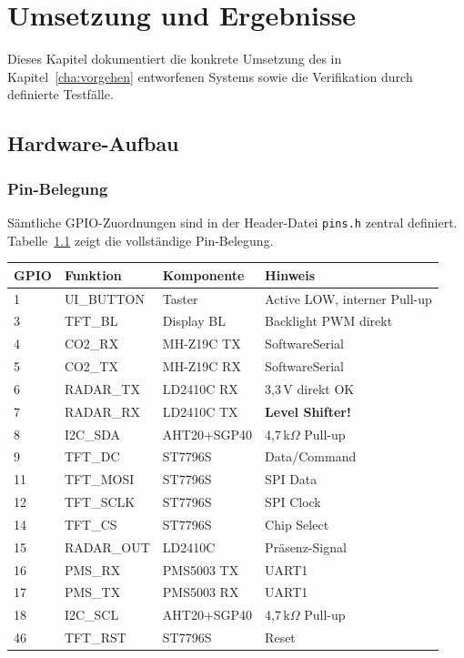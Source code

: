 \chapter{Umsetzung und Ergebnisse}
\label{cha:umsetzung}

Dieses Kapitel dokumentiert die konkrete Umsetzung des in Kapitel~\ref{cha:vorgehen} entworfenen Systems sowie die Verifikation durch definierte Testfälle.

\section{Hardware-Aufbau}
\label{sec:hw_aufbau}

\subsection{Pin-Belegung}
\label{sec:pinbelegung}

Sämtliche GPIO-Zuordnungen sind in der Header-Datei \texttt{pins.h} zentral definiert. Tabelle~\ref{tab:pinmap} zeigt die vollständige Pin-Belegung.

\begin{table}[htb]
\centering
\renewcommand{\arraystretch}{1.2}
\label{tab:pinmap}
\begin{tabular}{l l l p{4.5cm}}
\toprule
\rowcolor{tableheader}
\textbf{GPIO} & \textbf{Funktion} & \textbf{Komponente} & \textbf{Hinweis} \\
\midrule
1  & UI\_BUTTON  & Taster & Active LOW, interner Pull-up \\
3  & TFT\_BL     & Display BL & Backlight PWM direkt \\
4  & CO2\_RX     & MH-Z19C TX & SoftwareSerial \\
5  & CO2\_TX     & MH-Z19C RX & SoftwareSerial \\
6  & RADAR\_TX   & LD2410C RX & 3,3\,V direkt OK \\
7  & RADAR\_RX   & LD2410C TX & \textbf{Level Shifter!} \\
8  & I2C\_SDA    & AHT20+SGP40 & 4,7\,k$\Omega$ Pull-up \\
9  & TFT\_DC     & ST7796S & Data/Command \\
11 & TFT\_MOSI   & ST7796S & SPI Data \\
12 & TFT\_SCLK   & ST7796S & SPI Clock \\
14 & TFT\_CS     & ST7796S & Chip Select \\
15 & RADAR\_OUT  & LD2410C & Präsenz-Signal \\
16 & PMS\_RX     & PMS5003 TX & UART1 \\
17 & PMS\_TX     & PMS5003 RX & UART1 \\
18 & I2C\_SCL    & AHT20+SGP40 & 4,7\,k$\Omega$ Pull-up \\
46 & TFT\_RST    & ST7796S & Reset \\
\bottomrule
\end{tabular}
\end{table}

